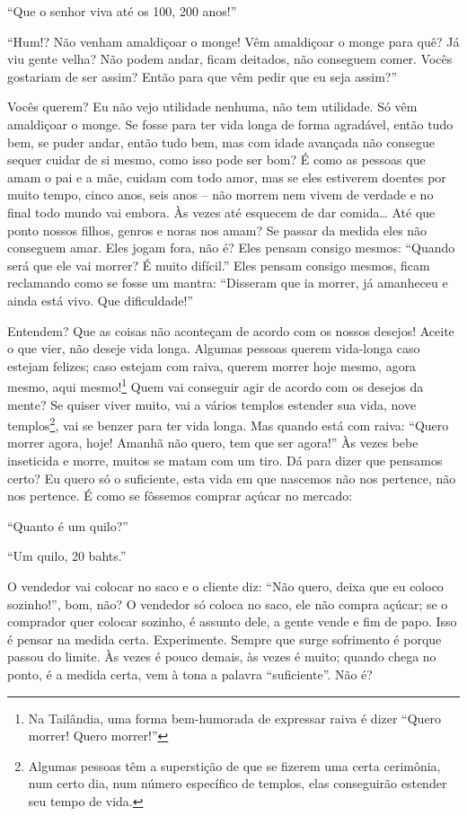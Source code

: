 “Que o senhor viva até os 100, 200 anos!” 

“Hum!? Não venham amaldiçoar o monge! Vêm amaldiçoar o monge para
quê? Já viu gente velha? Não podem andar, ficam deitados, não conseguem
comer. Vocês gostariam de ser assim? Então para que vêm pedir que eu
seja assim?”

Vocês querem? Eu não vejo utilidade nenhuma, não tem utilidade. Só
vêm amaldiçoar o monge. Se fosse para ter vida longa de forma
agradável, então tudo bem, se puder andar, então tudo bem, mas com
idade avançada não consegue sequer cuidar de si mesmo, como isso pode
ser bom? É como as pessoas que amam o pai e a mãe, cuidam com todo
amor, mas se eles estiverem doentes por muito tempo, cinco anos, seis
anos – não morrem nem vivem de verdade e no final todo mundo vai
embora. Às vezes até esquecem de dar comida… Até que ponto nossos
filhos, genros e noras nos amam? Se passar da medida eles não conseguem
amar. Eles jogam fora, não é? Eles pensam consigo mesmos: “Quando será
que ele vai morrer? É muito difícil.” Eles pensam consigo mesmos, ficam
reclamando como se fosse um mantra: “Disseram que ia morrer, já
amanheceu e ainda está vivo. Que dificuldade!”

Entendem? Que as coisas não aconteçam de acordo com os nossos
desejos! Aceite o que vier, não deseje vida longa. Algumas pessoas
querem vida-longa caso estejam felizes; caso estejam com raiva, querem
morrer hoje mesmo, agora mesmo, aqui mesmo!\footnote{Na Tailândia, uma
forma bem-humorada de expressar raiva é dizer “Quero morrer! Quero
morrer!” } Quem vai conseguir agir de acordo com os desejos da mente?
Se quiser viver muito, vai a vários templos estender sua vida, nove
templos\footnote{Algumas pessoas têm a superstição de que se fizerem
uma certa cerimônia, num certo dia, num número específico de templos,
elas conseguirão estender seu tempo de vida.}, vai se benzer para ter
vida longa. Mas quando está com raiva: “Quero morrer agora, hoje!
Amanhã não quero, tem que ser agora!” Às vezes bebe inseticida e morre,
muitos se matam com um tiro. Dá para dizer que pensamos certo? Eu quero
só o suficiente, esta vida em que nascemos não nos pertence, não nos
pertence. É como se fôssemos comprar açúcar no mercado:

“Quanto é um quilo?”

“Um quilo, 20 bahts.”

O vendedor vai colocar no saco e o cliente diz: “Não quero, deixa
que eu coloco sozinho!”, bom, não? O vendedor só coloca no saco, ele
não compra açúcar; se o comprador quer colocar sozinho, é assunto dele,
a gente vende e fim de papo. Isso é pensar na medida certa.
Experimente. Sempre que surge sofrimento é porque passou do limite. Às
vezes é pouco demais, às vezes é muito; quando chega no ponto, é a
medida certa, vem à tona a palavra “suficiente”. Não é?

